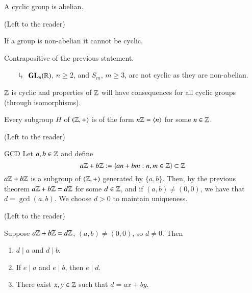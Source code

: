 \documentclass[12pt, a4paper, twoside, openright, titlepage]{book}
\begin{document}
\begin{rmk}{}{}
    A cyclic group is abelian.
    \begin{proof*}{}{}
        (Left to the reader)
    \end{proof*}
\end{rmk}

\begin{cor}{}{}
    If a group is non-abelian it cannot be cyclic.
    \begin{proof*}{}{}
        Contrapositive of the previous statement.
    \end{proof*}
\end{cor}
\begin{enumerate}
    \item[$\drsh$] $\mathbf{GL}_n(\mathbb R)$, $n \geq 2$, and $S_m$, $m \geq 3$, are not cyclic as they are non-abelian. 
\end{enumerate}


$\mathbb Z$ is cyclic and properties of $\mathbb Z$ will have consequences for all cyclic groups (through isomorphisms).

\begin{thm}{}{}
    Every subgroup $H$ of $(\mathbb Z,+)$ is of the form $n\mathbb Z = \langle n \rangle$ for some $n \in \mathbb Z$.
    \begin{proof*}{}{}
        (Left to the reader)
    \end{proof*}
\end{thm}

\begin{cor}{GCD}{}
    Let $a,b \in \mathbb Z$ and define \begin{equation}
        a\mathbb Z + b\mathbb Z := \{an + bm: n,m \in \mathbb Z\} \subset \mathbb Z
    \end{equation}
    $a\mathbb Z+b\mathbb Z$ is a subgroup of $(\mathbb Z,+)$ generated by $\{a,b\}$. Then, by the previous theorem $a\mathbb Z + b\mathbb Z = d\mathbb Z$ for some $d \in \mathbb Z$, and if $(a,b) \neq (0,0)$, we have that $d = \gcd(a,b)$. We choose $d > 0$ to maintain uniqueness.
    \begin{proof*}{}{}
        (Left to the reader)
    \end{proof*}
\end{cor}

\begin{cor}{}{}
    Suppose $a\mathbb Z + b\mathbb Z = d\mathbb Z$, $(a,b) \neq (0,0)$, so $d \neq 0$. Then \begin{enumerate}
        \item $d\;\vert\;a$ and $d\;\vert\;b$.
        \item If $e \;\vert\;a$ and $e\;\vert\;b$, then $e \;\vert\;d$.
        \item There exist $x,y \in \mathbb Z$ such that $d = ax + by$.
    \end{enumerate}
\end{cor}
\end{document}
